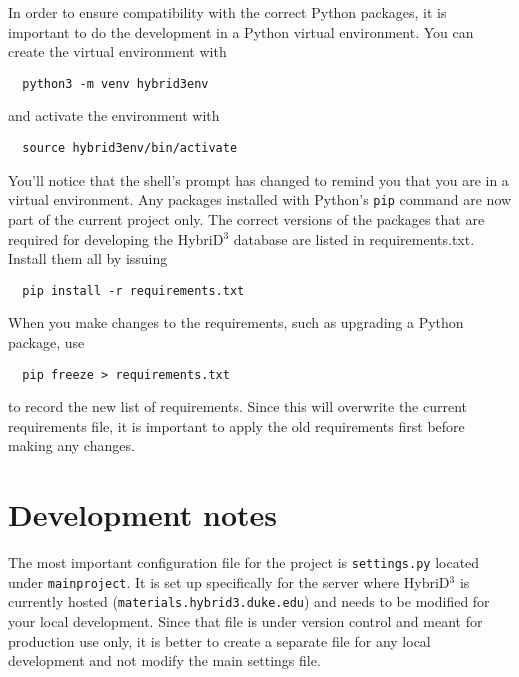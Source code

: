 \documentclass{article}
\begin{document}
In order to ensure compatibility with the correct Python packages, it is important to do the development in a Python virtual environment. You can create the virtual environment with
\begin{lstlisting}
  python3 -m venv hybrid3env
\end{lstlisting}
and activate the environment with
\begin{lstlisting}
  source hybrid3env/bin/activate
\end{lstlisting}
You'll notice that the shell's prompt has changed to remind you that you are in a virtual environment. Any packages installed with Python's \verb+pip+ command are now part of the current project only. The correct versions of the packages that are required for developing the HybriD$^3$ database are listed in requirements.txt. Install them all by issuing
\begin{lstlisting}
  pip install -r requirements.txt
\end{lstlisting}
When you make changes to the requirements, such as upgrading a Python package, use
\begin{lstlisting}
  pip freeze > requirements.txt
\end{lstlisting}
to record the new list of requirements. Since this will overwrite the current requirements file, it is important to apply the old requirements first before making any changes.

\section{Development notes}

The most important configuration file for the project is \texttt{settings.py} located under \texttt{mainproject}. It is set up specifically for the server where HybriD$^3$ is currently hosted (\texttt{materials.hybrid3.duke.edu}) and needs to be modified for your local development. Since that file is under version control and meant for production use only, it is better to create a separate file for any local development and not modify the main settings file.
\end{document}
